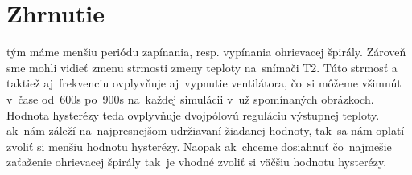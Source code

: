 \documentclass{article}
\begin{document}
\section{Zhrnutie}
\label{sec:zhrnutie}

tým máme menšiu periódu zapínania, resp. vypínania ohrievacej špirály. Zároveň sme mohli vidieť zmenu strmosti
zmeny teploty na~snímači T2. Túto strmosť a taktiež aj~frekvenciu ovplyvňuje aj~vypnutie ventilátora, čo~si môžeme
všimnút v~čase od~600s po~900s na~každej simulácii v~už spomínaných obrázkoch. Hodnota hysterézy teda ovplyvňuje
dvojpólovú reguláciu výstupnej teploty. ak~nám záleží na~najpresnejšom udržiavaní žiadanej hodnoty, tak~sa nám
oplatí zvoliť si menšiu hodnotu hysterézy. Naopak ak~chceme dosiahnuť čo~najmešie zaťaženie ohrievacej špirály
tak~je vhodné zvoliť si väčšiu hodnotu hysterézy.
\end{document}
